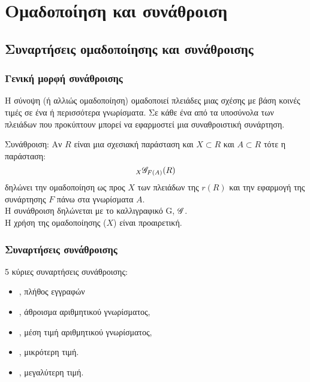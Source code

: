 
\section[{\en sumFunc}]{\textgreek{Ομαδοποίηση και συνάθροιση}}

\subsection[{\en sumFunc}]{\textgreek{Συναρτήσεις ομαδοποίησης και συνάθροισης}}

\begin{frame}
\frametitle{Γενική μορφή συνάθροισης}
Η σύνοψη (ή αλλιώς ομαδοποίηση) ομαδοποιεί πλειάδες μιας σχέσης με βάση κοινές τιμές σε ένα ή περισσότερα γνωρίσματα.
Σε κάθε ένα από τα υποσύνολα των πλειάδων που προκύπτουν μπορεί να εφαρμοστεί μια συναθροιστική συνάρτηση.
\begin{minipage}{\wE}

  \begin{block}{Συνάθροιση:}
    Αν $R$ είναι μια σχεσιακή παράσταση και $X \subset R$ και $A \subset R$ τότε η παράσταση:
      \en
      \[ {}_{X} \mathscr{G}_{F(A)} (R) \]
      \el
    δηλώνει την ομαδοποίηση ως προς $X$ των πλειάδων της $r(R)$ και την εφαρμογή της συνάρτησης $F$ πάνω στα γνωρίσματα $A$. \\
    Η συνάθροιση δηλώνεται με το καλλιγραφικό {\en G}, $\mathscr{G}$. \\
    Η χρήση της ομαδοποίησης ($X$) είναι προαιρετική.
  \end{block}
\end{minipage}
\end{frame}


\begin{frame}
\frametitle{Συναρτήσεις συνάθροισης}
\begin{minipage}{\wE}
  \begin{block}{5 κύριες συναρτήσεις συνάθροισης:}
    \begin{itemize} \itemsep9pt
      \item \tcount, πλήθος εγγραφών
      \item \tsum,  άθροισμα αριθμητικού γνωρίσματος,
      \item \tavg,  μέση τιμή αριθμητικού γνωρίσματος,
      \item \tmin,  μικρότερη τιμή.
      \item \tmax,  μεγαλύτερη τιμή.
    \end{itemize}
  \end{block}
\end{minipage}
\end{frame}


